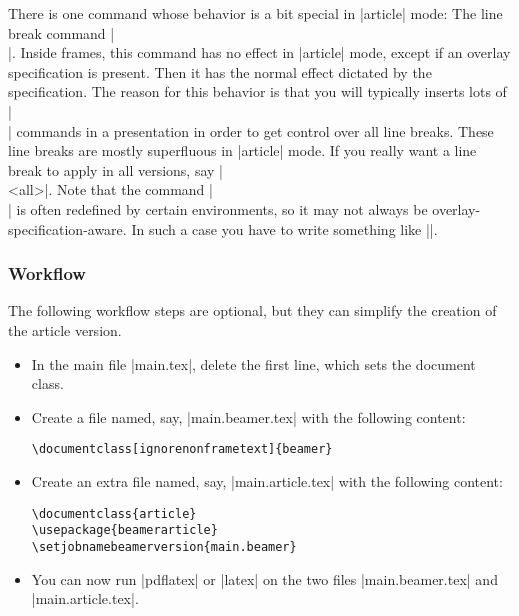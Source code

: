 There is one command whose behavior is a bit special in |article| mode: The line break command |\\|. Inside frames, this command has no effect in |article| mode, except if an overlay specification is present. Then it has the normal effect dictated by the specification. The reason for this behavior is that you will typically inserts lots of |\\| commands in a presentation in order to get control over all line breaks. These line breaks are mostly superfluous in |article| mode. If you really want a line break to apply in all versions, say |\\<all>|. Note that the command |\\| is often redefined by certain environments, so it may not always be overlay-specification-aware. In such a case you have to write something like ||.

\subsubsection{Workflow}
\label{section-article-version-workflow}

The following workflow steps are optional, but they can simplify the creation of the article version.

\begin{itemize}
\item
  In the main file |main.tex|, delete the first line, which sets the document class.
\item
  Create a file named, say, |main.beamer.tex| with the following content:

\begin{verbatim}
\documentclass[ignorenonframetext]{beamer}

\end{verbatim}

\item
  Create an extra file named, say, |main.article.tex| with the following content:

\begin{verbatim}
\documentclass{article}
\usepackage{beamerarticle}
\setjobnamebeamerversion{main.beamer}

\end{verbatim}

\item
  You can now run |pdflatex| or |latex| on the two files |main.beamer.tex| and |main.article.tex|.
\end{itemize}

